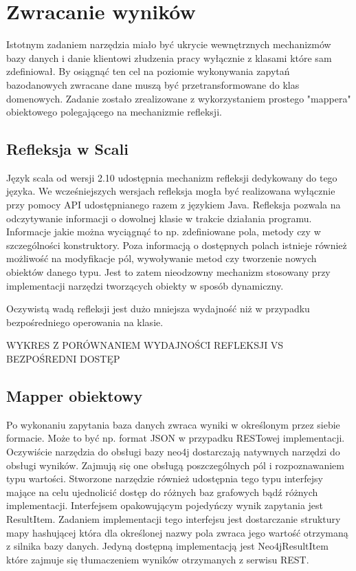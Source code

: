 \documentclass[brudnopis]{xmgr}
\begin{document}
\section{Zwracanie wyników}

Istotnym zadaniem narzędzia miało być ukrycie wewnętrznych mechanizmów bazy danych i danie klientowi złudzenia pracy wyłącznie z klasami które sam zdefiniował. By osiągnąć ten cel na poziomie wykonywania zapytań bazodanowych zwracane dane muszą być przetransformowane do klas domenowych. Zadanie zostało zrealizowane z wykorzystaniem prostego "mappera" obiektowego polegającego na mechanizmie refleksji.

\subsection{Refleksja w Scali}

Język scala od wersji 2.10 udostępnia mechanizm refleksji dedykowany do tego języka. We wcześniejszych wersjach refleksja mogła być realizowana wyłącznie przy pomocy API udostępnianego razem z językiem Java. Refleksja pozwala na odczytywanie informacji o dowolnej klasie w trakcie działania programu. Informacje jakie można wyciągnąć to np. zdefiniowane pola, metody czy w szczególności konstruktory. Poza informacją o dostępnych polach istnieje również możliwość na modyfikacje pól, wywoływanie metod czy tworzenie nowych obiektów danego typu. Jest to zatem nieodzowny mechanizm stosowany przy implementacji narzędzi tworzących obiekty w sposób dynamiczny.

Oczywistą wadą refleksji jest dużo mniejsza wydajność niż w przypadku bezpośredniego operowania na klasie.

WYKRES Z PORÓWNANIEM WYDAJNOŚCI REFLEKSJI VS BEZPOŚREDNI DOSTĘP

\subsection{Mapper obiektowy}

Po wykonaniu zapytania baza danych zwraca wyniki w określonym przez siebie formacie. Może to być np. format JSON w przypadku RESTowej implementacji. Oczywiście narzędzia do obsługi bazy neo4j dostarczają natywnych narzędzi do obsługi wyników. Zajmują się one obsługą poszczególnych pól i rozpoznawaniem typu wartości. Stworzone narzędzie również udostępnia tego typu interfejsy mające na celu ujednolicić dostęp do różnych baz grafowych bądź różnych implementacji. Interfejsem opakowującym pojedyńczy wynik zapytania jest ResultItem. Zadaniem implementacji tego interfejsu jest dostarczanie struktury mapy hashującej która dla określonej nazwy pola zwraca jego wartość otrzymaną z silnika bazy danych. Jedyną dostępną implementacją jest Neo4jResultItem które zajmuje się tłumaczeniem wyników otrzymanych z serwisu REST.
\end{document}
